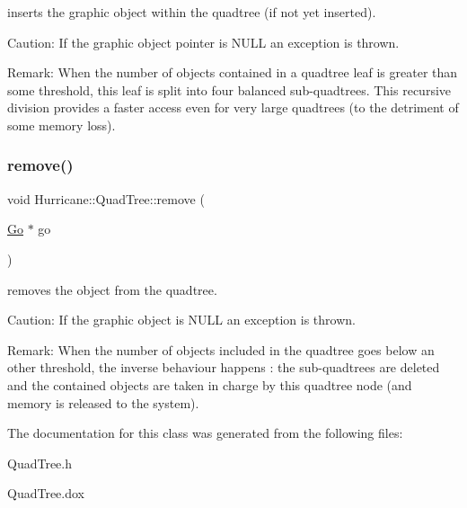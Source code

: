inserts the graphic object within the quadtree (if not yet inserted).

\begin{DoxyParagraph}{Caution\+: If the graphic object pointer is N\+U\+LL an exception is thrown. }

\end{DoxyParagraph}
\begin{DoxyParagraph}{Remark\+: When the number of objects contained in a quadtree leaf is }
greater than some threshold, this leaf is split into four balanced sub-\/quadtrees. This recursive division provides a faster access even for very large quadtrees (to the detriment of some memory loss). 
\end{DoxyParagraph}
\mbox{\label{classHurricane_1_1QuadTree_af646d2864c70f6456d845c2d6a8d1785}} 
\subsubsection{\texorpdfstring{remove()}{remove()}}
{\footnotesize\ttfamily void Hurricane\+::\+Quad\+Tree\+::remove (\begin{DoxyParamCaption}\item[{\mbox{\hyperlink{classHurricane_1_1Go}{Go}} $\ast$}]{go }\end{DoxyParamCaption})}

removes the object from the quadtree.

\begin{DoxyParagraph}{Caution\+: If the graphic object is N\+U\+LL an exception is thrown. }

\end{DoxyParagraph}
\begin{DoxyParagraph}{Remark\+: When the number of objects included in the quadtree goes }
below an other threshold, the inverse behaviour happens \+: the sub-\/quadtrees are deleted and the contained objects are taken in charge by this quadtree node (and memory is released to the system). 
\end{DoxyParagraph}


The documentation for this class was generated from the following files\+:\begin{DoxyCompactItemize}
\item 
Quad\+Tree.\+h\item 
Quad\+Tree.\+dox\end{DoxyCompactItemize}
